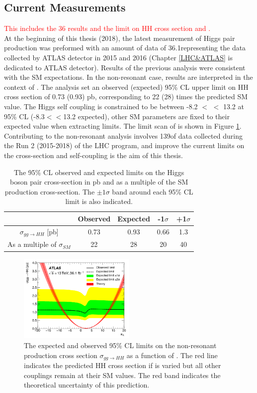 \subsection{Current Measurements}
\label{chap1:HH:CM}
\textcolor{red}{This includes the 36 \ifb results and the limit on HH cross section and \kl.} \\
At the beginning of this thesis (2018), the latest measurement of Higgs pair production was preformed with an amount of data of 36.1\ifb representing the data collected by ATLAS detector in 2015 and 2016 (Chapter \ref{LHC&ATLAS} is dedicated to ATLAS detector). Results of the previous analysis were consistent with the SM expectations. In the non-resonant case, results are interpreted in the context of \kl. The analysis set an observed (expected) 95\% CL upper limit on HH cross section of 0.73 (0.93) pb, corresponding to 22 (28) times the predicted SM value. The Higgs self coupling is constrained to be between -8.2 $<$ \kl $<$ 13.2 at 95\% CL (-8.3$<$\kl$<$13.2 expected), other SM parameters are fixed to their expected value when extracting limits. The limit scan of \kl is shown in Figure \ref{fig:chap1:HH:CM:KL}. \\
Contributing to the \HHyybb non-resonant analysis involves 139\ifb of data collected during the Run 2 (2015-2018) of the LHC program, and improve the current limits on the cross-section and self-coupling is the aim of this thesis. 
\begin{table}[H]
    \centering
    \begin{tabular}{ccccc}
    \hline
         & Observed & Expected & -1$\sigma$ & +1$\sigma$ \\
    \hline
        $\sigma_{gg\rightarrow HH}$ [pb] & 0.73 & 0.93 & 0.66 & 1.3 \\
        As a multiple of $\sigma_{SM}$ & 22 & 28 & 20 & 40 \\
        \hline
    \end{tabular}
    \caption{The 95\% CL observed and expected limits on the Higgs boson pair cross-section in pb and as a multiple of the SM production cross-section. The $\pm1\sigma$ band around each 95\% CL limit is also indicated.}
    \label{tab:chap1:HH:CM:XSEC}
\end{table}
\begin{figure}[H]
    \centering
    \includegraphics[width=0.5\textwidth]{Ch1/Img/kl_36ifb.png}
    \caption{The expected and observed 95\% CL limits on the non-resonant production cross section $\sigma_{gg\rightarrow HH}$ as a function of \kl. The red line indicates the predicted HH cross section if \kl is varied but all other couplings remain at their SM values. The red band indicates the theoretical uncertainty of this prediction.}
    \label{fig:chap1:HH:CM:KL}
\end{figure}
